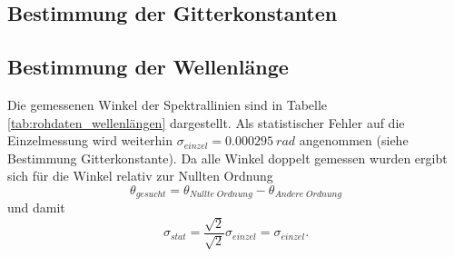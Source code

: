\documentclass[12pt,a4paper]{article}
\begin{document}
\subsection{Bestimmung der Gitterkonstanten}

\subsection{Bestimmung der Wellenlänge}

Die gemessenen Winkel der Spektrallinien sind in Tabelle \ref{tab:rohdaten_wellenlängen} dargestellt. Als statistischer Fehler auf die Einzelmessung wird weiterhin $\sigma_{einzel} = \SI{0.000295}{rad}$ angenommen (siehe Bestimmung Gitterkonstante). Da alle Winkel doppelt gemessen wurden ergibt sich für die Winkel relativ zur Nullten Ordnung
\begin{equation}
\theta_{gesucht} = \theta_{Nullte\;Ordnung} - \theta_{Andere\;Ordnung}
\end{equation}
und damit
\begin{equation}
\sigma_{stat} = \frac{\sqrt{2}}{\sqrt{2}} \sigma_{einzel} = \sigma_{einzel}.
\end{equation}
\end{document}
